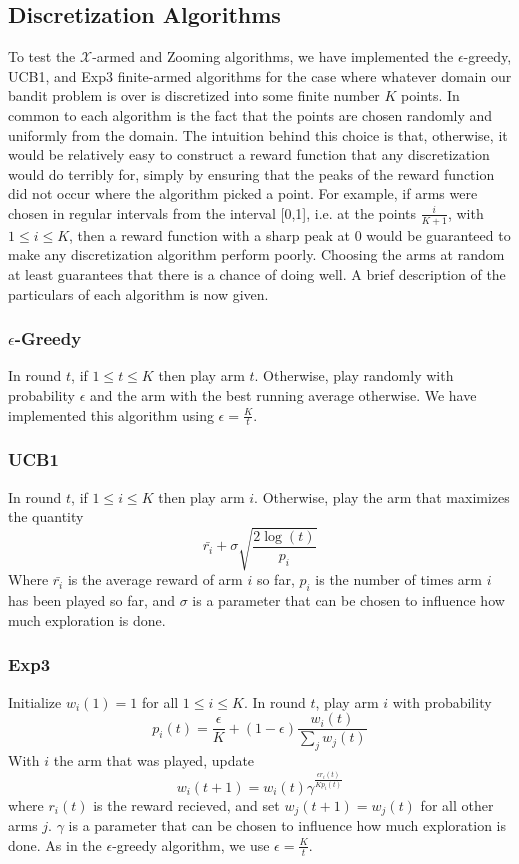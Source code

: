 \subsection{Discretization Algorithms}
To test the $\mathcal{X}$-armed and Zooming algorithms, we have implemented
the $\epsilon$-greedy, UCB1, and Exp3 finite-armed algorithms for
the case where whatever domain our bandit problem is over is discretized
into some finite number $K$ points.  In common to each algorithm is the
fact that the points are chosen randomly and uniformly from the domain.  The
intuition behind this choice is that, otherwise, it would be relatively easy
to construct a reward function that any discretization would do terribly
for, simply by ensuring that the peaks of the reward function did not occur
where the algorithm picked a point.  For example, if arms were chosen in
regular intervals from the interval [0,1], i.e. at the points 
$\frac{i}{K+1}$, with $1 \leq i \leq K$, then a reward function with a
sharp peak at 0 would be guaranteed to make any discretization algorithm
perform poorly.  Choosing the arms at random at least guarantees that there
is a chance of doing well.  A brief description of the particulars of 
each algorithm is now given.

\subsubsection{$\epsilon$-Greedy}
In round $t$, if $1 \leq t \leq K$ then play arm $t$.  Otherwise, play
randomly with probability $\epsilon$ and the arm with the best running
average otherwise.  We have implemented this algorithm using
$\epsilon = \frac{K}{t}$.

\subsubsection{UCB1}
In round $t$, if $1 \leq i \leq K$ then play arm $i$.  Otherwise, play
the arm that maximizes the quantity
\[
	\bar{r_i} + \sigma \sqrt{\frac{2 \log(t)}{p_i}}
\]
Where $\bar{r_i}$ is the average reward of arm $i$ so far, $p_i$ is the 
number of times arm $i$ has been played so far, and $\sigma$ is a parameter
that can be chosen to influence how much exploration is done.

\subsubsection{Exp3}
Initialize $w_i(1) = 1$ for all $1 \leq i \leq K$.  In round $t$, play
arm $i$ with probability
\[
	p_i(t) = \frac{\epsilon}{K} + (1 - \epsilon) \frac{w_i(t)}{\sum_j w_j(t)}
\]
With $i$ the arm that was played, update
\[
	w_i(t+1) = w_i(t)\gamma^{\frac{\epsilon r_i(t)}{K p_i(t)}}
\]
where $r_i(t)$ is the reward recieved, and set $w_j(t+1) = w_j(t)$ for all
other arms $j$.  $\gamma$ is a parameter that can be chosen to influence how
much exploration is done.  As in the $\epsilon$-greedy algorithm, we use
$\epsilon = \frac{K}{t}$.